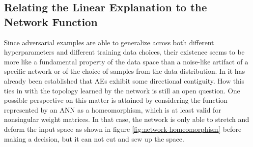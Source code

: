\documentclass[11pt, a4paper]{article}
\begin{document}
\subsection{Relating the Linear Explanation to the Network Function}
Since adversarial examples are able to generalize across both different hyperparameters and different training data choices, their existence seems to be more like a fundamental property of the data space than a noise-like artifact of a specific network or of the choice of samples from the data distribution. In \cite{explaining-and-harnessing-adversarial-examples} it has already been established that AEs exhibit some directional contiguity. How this ties in with the topology learned by the network is still an open question. One possible perspective on this matter is attained by considering the function represented by an ANN as a homeomorphism, which is at least valid for nonsingular weight matrices. In that case, the network is only able to stretch and deform the input space as shown in figure \ref{fig:network-homeomorphism} before making a decision, but it can not cut and sew up the space.
\end{document}
